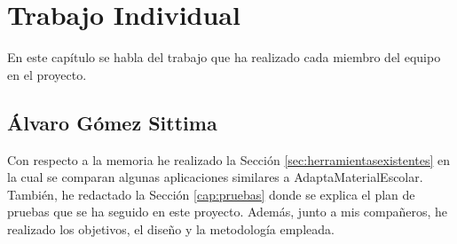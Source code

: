 \chapter{Trabajo Individual}
\label{cap:TrabajoIndividual}

En este capítulo se habla del trabajo que ha realizado cada miembro del equipo en el proyecto.

\section{Álvaro Gómez Sittima}
Con respecto a la memoria he realizado la Sección \ref{sec:herramientasexistentes} en la cual se comparan algunas aplicaciones similares a AdaptaMaterialEscolar. También, he redactado la Sección \ref{cap:pruebas} donde se explica el plan de pruebas que se ha seguido en este proyecto. Además, junto a mis compañeros, he realizado los objetivos, el diseño y la metodología empleada.
